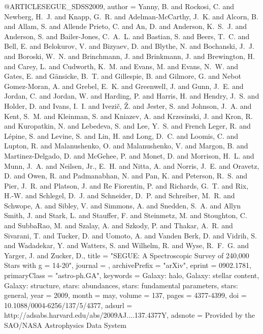 \documentclass[apj]{emulateapj}
\begin{document}
{{{{{{{{{{{{@ARTICLE{SEGUE_SDSS2009,
   author = {{Yanny}, B. and {Rockosi}, C. and {Newberg}, H.~J. and {Knapp}, G.~R. and 
	{Adelman-McCarthy}, J.~K. and {Alcorn}, B. and {Allam}, S. and 
	{Allende Prieto}, C. and {An}, D. and {Anderson}, K.~S.~J. and 
	{Anderson}, S. and {Bailer-Jones}, C.~A.~L. and {Bastian}, S. and 
	{Beers}, T.~C. and {Bell}, E. and {Belokurov}, V. and {Bizyaev}, D. and 
	{Blythe}, N. and {Bochanski}, J.~J. and {Boroski}, W.~N. and 
	{Brinchmann}, J. and {Brinkmann}, J. and {Brewington}, H. and 
	{Carey}, L. and {Cudworth}, K.~M. and {Evans}, M. and {Evans}, N.~W. and 
	{Gates}, E. and {G{\"a}nsicke}, B.~T. and {Gillespie}, B. and 
	{Gilmore}, G. and {Nebot Gomez-Moran}, A. and {Grebel}, E.~K. and 
	{Greenwell}, J. and {Gunn}, J.~E. and {Jordan}, C. and {Jordan}, W. and 
	{Harding}, P. and {Harris}, H. and {Hendry}, J.~S. and {Holder}, D. and 
	{Ivans}, I.~I. and {Ivezi{\v c}}, {\v Z}. and {Jester}, S. and 
	{Johnson}, J.~A. and {Kent}, S.~M. and {Kleinman}, S. and {Kniazev}, A. and 
	{Krzesinski}, J. and {Kron}, R. and {Kuropatkin}, N. and {Lebedeva}, S. and 
	{Lee}, Y.~S. and {French Leger}, R. and {L{\'e}pine}, S. and 
	{Levine}, S. and {Lin}, H. and {Long}, D.~C. and {Loomis}, C. and 
	{Lupton}, R. and {Malanushenko}, O. and {Malanushenko}, V. and 
	{Margon}, B. and {Martinez-Delgado}, D. and {McGehee}, P. and 
	{Monet}, D. and {Morrison}, H.~L. and {Munn}, J.~A. and {Neilsen}, Jr., E.~H. and 
	{Nitta}, A. and {Norris}, J.~E. and {Oravetz}, D. and {Owen}, R. and 
	{Padmanabhan}, N. and {Pan}, K. and {Peterson}, R.~S. and {Pier}, J.~R. and 
	{Platson}, J. and {Re Fiorentin}, P. and {Richards}, G.~T. and 
	{Rix}, H.-W. and {Schlegel}, D.~J. and {Schneider}, D.~P. and 
	{Schreiber}, M.~R. and {Schwope}, A. and {Sibley}, V. and {Simmons}, A. and 
	{Snedden}, S.~A. and {Allyn Smith}, J. and {Stark}, L. and {Stauffer}, F. and 
	{Steinmetz}, M. and {Stoughton}, C. and {SubbaRao}, M. and {Szalay}, A. and 
	{Szkody}, P. and {Thakar}, A.~R. and {Sivarani}, T. and {Tucker}, D. and 
	{Uomoto}, A. and {Vanden Berk}, D. and {Vidrih}, S. and {Wadadekar}, Y. and 
	{Watters}, S. and {Wilhelm}, R. and {Wyse}, R.~F.~G. and {Yarger}, J. and 
	{Zucker}, D.},
    title = "{SEGUE: A Spectroscopic Survey of 240,000 Stars with g = 14-20}",
  journal = {\aj},
archivePrefix = "arXiv",
   eprint = {0902.1781},
 primaryClass = "astro-ph.GA",
 keywords = {Galaxy: halo, Galaxy: stellar content, Galaxy: structure, stars: abundances, stars: fundamental parameters, stars: general},
     year = 2009,
    month = may,
   volume = 137,
    pages = {4377-4399},
      doi = {10.1088/0004-6256/137/5/4377},
   adsurl = {http://adsabs.harvard.edu/abs/2009AJ....137.4377Y},
  adsnote = {Provided by the SAO/NASA Astrophysics Data System}
}




}}}}}}}}}}}}
\end{document}
